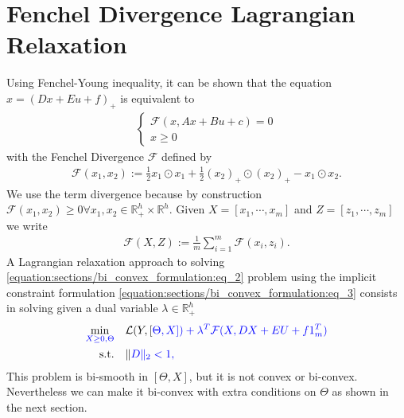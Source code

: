 \documentclass[letterpaper,10pt,english]{sphinxmanual}
\begin{document}
\section{Fenchel Divergence Lagrangian Relaxation}
\label{\detokenize{sections/bi_convex_formulation:fenchel-divergence-lagrangian-relaxation}}
Using Fenchel-Young inequality, it can be shown that the equation \(x = (Dx + Eu + f)_+\) is equivalent to
\begin{equation}\label{equation:sections/bi_convex_formulation:eq_3}
\begin{split}\begin{cases}
    \mathcal{F}(x,Ax + Bu + c) = 0 \\
    x \geq 0
\end{cases}\end{split}
\end{equation}
with the Fenchel Divergence \(\mathcal{F}\) defined by
\begin{equation*}
\begin{split}\mathcal{F}(x_1,x_2) := \frac{1}{2} x_1 \odot x_1 + \frac{1}{2} (x_2)_+ \odot (x_2)_+ - x_1 \odot x_2.\end{split}
\end{equation*}
We use the term divergence because by construction \(\mathcal{F}(x_1,x_2) \geq 0 \forall x_1,x_2 \in \mathbb{R}_+^h \times \mathbb{R}^h\).
Given \(X = [x_1, \cdots, x_m]\) and \(Z = [z_1, \cdots, z_m]\) we write
\begin{equation*}
\begin{split}\mathcal{F}(X,Z) := \frac{1}{m} \sum_{i=1}^m \mathcal{F}(x_i,z_i).\end{split}
\end{equation*}
A Lagrangian relaxation approach to solving \eqref{equation:sections/bi_convex_formulation:eq_2} problem using the implicit constraint formulation \eqref{equation:sections/bi_convex_formulation:eq_3} consists in
solving given a dual variable \(\lambda \in \mathbb{R}_+^h\)
\begin{equation}\label{equation:sections/bi_convex_formulation:eq_4}
\begin{split}\begin{align}
    \min_{\color{blue}{X} \geq 0, \color{blue}{\Theta}} \quad &\mathcal{L}(Y,[\color{blue}{\Theta},\color{blue}{X}]) + \lambda^T \mathcal{F}(\color{blue}{X},\color{blue}{DX} + \color{blue}{E}U + \color{blue}{f}1_m^T) \\
    \text{s.t.} \quad &\Vert \color{blue}{D} \Vert_2 < 1,
\end{align}\end{split}
\end{equation}
This problem is bi-smooth in \([\Theta,X]\), but it is not convex or bi-convex. Nevertheless we can make it bi-convex
with extra conditions on \(\Theta\) as shown in the next section.
\end{document}
